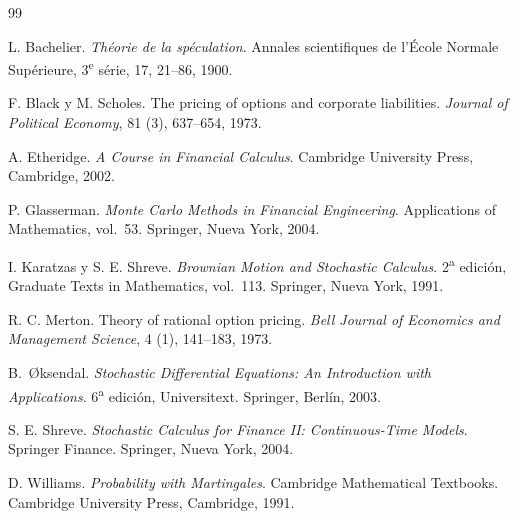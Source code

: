 \documentclass[11pt,a4paper,oneside]{report}
\theoremstyle{plain}
\theoremstyle{definition}
\theoremstyle{remark}
\newcommand{\1}{\mathbf{1}}
\begin{document}
\begin{thebibliography}{99}

L. Bachelier.
\emph{Théorie de la spéculation}.
Annales scientifiques de l'École Normale Supérieure, 3\textsuperscript{e}
série, 17, 21--86, 1900.

F. Black y M. Scholes.
The pricing of options and corporate liabilities.
\emph{Journal of Political Economy}, 81 (3), 637--654, 1973.

A. Etheridge.
\emph{A Course in Financial Calculus}.
Cambridge University Press, Cambridge, 2002.

P. Glasserman.
\emph{Monte Carlo Methods in Financial Engineering}.
Applications of Mathematics, vol.~53. Springer, Nueva York, 2004.

I. Karatzas y S. E. Shreve.
\emph{Brownian Motion and Stochastic Calculus}.
2\textsuperscript{a} edición, Graduate Texts in Mathematics, vol.~113.
Springer, Nueva York, 1991.

R. C. Merton.
Theory of rational option pricing.
\emph{Bell Journal of Economics and Management Science}, 4 (1),
141--183, 1973.

B.~\O{}ksendal.
\emph{Stochastic Differential Equations: An Introduction with
Applications}.
6\textsuperscript{a} edición, Universitext. Springer, Berlín, 2003.

S. E. Shreve.
\emph{Stochastic Calculus for Finance II: Continuous-Time Models}.
Springer Finance. Springer, Nueva York, 2004.

D. Williams.
\emph{Probability with Martingales}.
Cambridge Mathematical Textbooks. Cambridge University Press,
Cambridge, 1991.

\end{thebibliography}
\end{document}
